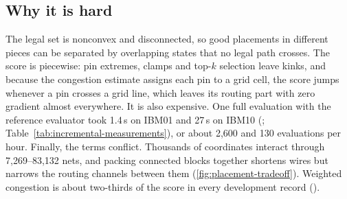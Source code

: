 \subsection{Why it is hard}\label{sec:hard}

The legal set is nonconvex and disconnected, so good placements in different pieces
can be separated by overlapping states that no legal path crosses. The score is
piecewise: pin extremes, clamps and top-$k$ selection leave kinks, and because the
congestion estimate assigns each pin to a grid cell, the score jumps whenever a pin
crosses a grid line, which leaves its routing part with zero gradient almost
everywhere. It is also expensive. One full evaluation with the reference evaluator
took 1.4\,s on IBM01 and 27\,s on IBM10 (\measurement;
Table~\ref{tab:incremental-measurements}), or about 2,600 and 130 evaluations per
hour. Finally, the terms conflict. Thousands of coordinates interact through
7,269--83,132 nets, and packing connected blocks together shortens wires but narrows
the routing channels between them (\cref{fig:placement-tradeoff}). Weighted
congestion is about two-thirds of the score in every development record
(\historical).

